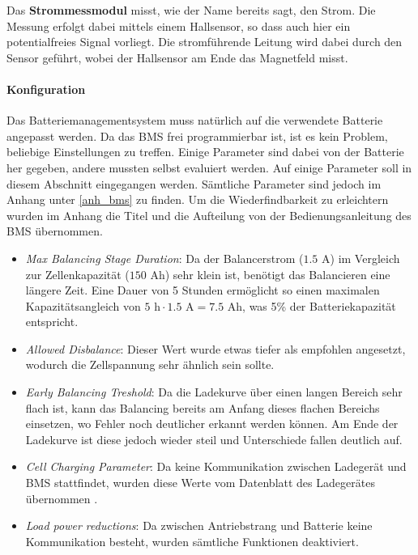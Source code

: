 Das \textbf{Strommessmodul} misst, wie der Name bereits sagt, den Strom. Die Messung erfolgt dabei mittels einem Hallsensor, so dass auch hier ein potentialfreies Signal vorliegt. Die stromführende Leitung wird dabei durch den Sensor geführt, wobei der Hallsensor am Ende das Magnetfeld misst.

\paragraph{Konfiguration}
Das Batteriemanagementsystem muss natürlich auf die verwendete Batterie angepasst werden. Da das BMS frei programmierbar ist, ist es kein Problem, beliebige Einstellungen zu treffen. Einige Parameter sind dabei von der Batterie her gegeben, andere mussten selbst evaluiert werden. Auf einige Parameter soll in diesem Abschnitt eingegangen werden. Sämtliche Parameter sind jedoch im Anhang unter \ref{anh_bms} zu finden. Um die Wiederfindbarkeit zu erleichtern wurden im Anhang die Titel und die Aufteilung von der Bedienungsanleitung des BMS \cite{bms} übernommen. \begin{itemize}
	\item \textit{Max Balancing Stage Duration}: Da der Balancerstrom ($1.5$ A) im Vergleich zur Zellenkapazität ($150$ Ah) sehr klein ist, benötigt das Balancieren eine längere Zeit. Eine Dauer von 5 Stunden ermöglicht so einen maximalen Kapazitätsangleich von $5\text{ h}\cdot 1.5\text{ A}=7.5$ Ah, was 5\% der Batteriekapazität entspricht.
	\item \textit{Allowed Disbalance}: Dieser Wert wurde etwas tiefer als empfohlen angesetzt, wodurch die Zellspannung sehr ähnlich sein sollte.
	\item \textit{Early Balancing Treshold}: Da die Ladekurve über einen langen Bereich sehr flach ist, kann das Balancing bereits am Anfang dieses flachen Bereichs einsetzen, wo Fehler noch deutlicher erkannt werden können. Am Ende der Ladekurve ist diese jedoch wieder steil und Unterschiede fallen deutlich auf.
	\item \textit{Cell Charging Parameter}: Da keine Kommunikation zwischen Ladegerät und BMS stattfindet, wurden diese Werte vom Datenblatt des Ladegerätes übernommen \cite{ladegeraet}.
	\item \textit{Load power reductions}: Da zwischen Antriebstrang und Batterie keine Kommunikation besteht, wurden sämtliche Funktionen deaktiviert.
\end{itemize}